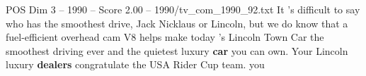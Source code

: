 \begin{textsample}{POS Dim 3 – 1990 – Score 2.00 – 1990/tv\_com\_1990\_92.txt}  \label{ex:f3_pos_076}
It 's difficult to say who has the smoothest drive, Jack Nicklaus or Lincoln, but we do know that a fuel-efficient overhead cam V8 helps make today 's Lincoln Town Car the smoothest driving ever and the quietest luxury \textbf{car} you can own.
Your Lincoln luxury \textbf{dealers} congratulate the USA Rider Cup team. you

\end{textsample}
